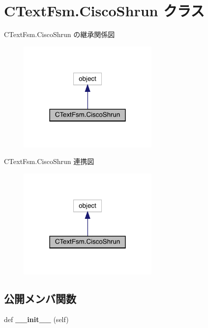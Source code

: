 \hypertarget{classCTextFsm_1_1CiscoShrun}{}\section{C\+Text\+Fsm.\+Cisco\+Shrun クラス}
\label{classCTextFsm_1_1CiscoShrun}


C\+Text\+Fsm.\+Cisco\+Shrun の継承関係図
\nopagebreak
\begin{figure}[H]
\begin{center}
\leavevmode
\includegraphics[width=195pt]{classCTextFsm_1_1CiscoShrun__inherit__graph}
\end{center}
\end{figure}


C\+Text\+Fsm.\+Cisco\+Shrun 連携図
\nopagebreak
\begin{figure}[H]
\begin{center}
\leavevmode
\includegraphics[width=195pt]{classCTextFsm_1_1CiscoShrun__coll__graph}
\end{center}
\end{figure}
\subsection*{公開メンバ関数}
\begin{DoxyCompactItemize}
\item 
\mbox{\label{classCTextFsm_1_1CiscoShrun_ad676c9612b4353c6160e5ac3bc7bc48d}} 
def {\bfseries \+\_\+\+\_\+init\+\_\+\+\_\+} (self)
\end{DoxyCompactItemize}
